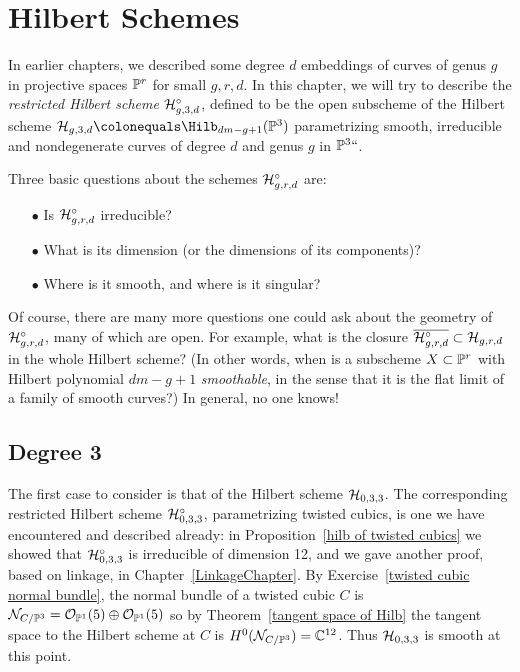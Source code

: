 

\chapter{Hilbert Schemes}
\label{HilbertSchemesChapter}

In earlier chapters, we described some  degree $d$ embeddings of curves
of  genus $g$ in projective spaces $\mathbb P^r$ for small $g,r,d$. In this
chapter, we will try to describe the \emph{restricted Hilbert scheme}
%
%
%
$\mathcal H^\circ_{g,3,d}$, defined to be the open subscheme of the Hilbert
scheme $\cH_{g,3,d} \colonequals  \Hilb_{dm-g+1}(\PP^3)$ parametrizing smooth,
%
%
irreducible and nondegenerate curves of degree $d$ and genus $g$
in $\mathbb P^3` `$.

Three basic questions about the schemes $\mathcal H^\circ_{g,r,d}$ are:

\begin{enumerate}
\item[$\bullet$] Is $\mathcal H^\circ_{g,r,d}$ irreducible?
\item[$\bullet$]  What is its dimension (or the dimensions of its
components)?
\item[$\bullet$] Where is it smooth, and where is it singular?
\end{enumerate}

Of course, there are many more questions one could ask about the geometry
of $\mathcal H^\circ_{g,r,d}$, many of which are open. For example,  what is the
closure $\overline{\mathcal H^\circ_{g,r,d}} \subset \mathcal H_{g,r,d}$ in the whole
Hilbert scheme? (In other words, when is a subscheme $X \subset \mathbb P^r$
with Hilbert polynomial $dm-g+1$ \emph{smoothable}, in the sense that it
%
is the flat limit of a family of smooth curves?) In general, no one knows!


\section{Degree 3}\label{degree 3}

The first case to consider is that of the Hilbert scheme
$\mathcal H_{0,3,3}$. The corresponding restricted Hilbert scheme
%
$\mathcal H^\circ_{0,3,3}$, parametrizing
twisted cubics,
%
is one we have
encountered and described already: in Proposition~\ref{hilb of twisted
cubics} we showed that $\mathcal H^\circ_{0,3,3}$ is irreducible of dimension 12,
%
and we gave another proof, based on linkage, in
Chapter~\ref{LinkageChapter}.
By Exercise~\ref{twisted cubic normal bundle}, the normal bundle of a
%
twisted cubic $C$ is ${\mathcal N}_{C/\mathbb P^3}={\mathcal O}_{\mathbb P^1}(5)\oplus {\mathcal O}_{\mathbb P^1}(5)$
so by Theorem~\ref{tangent space of Hilb} the tangent space to the
Hilbert scheme at $C$ is
$H^0({\mathcal N}_{C/\mathbb P^3}) = {\mathbb C}^{12}$. Thus $\mathcal H_{0,3,3}$ is smooth at this
point.

